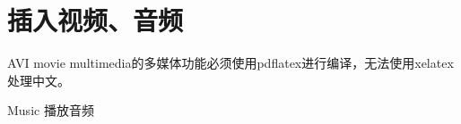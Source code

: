 \documentclass[xcolor=table,aspectratio=169]{beamer}
\begin{document}
\section{插入视频、音频}
\begin{frame}{AVI movie}
multimedia的多媒体功能必须使用pdflatex进行编译，无法使用xelatex处理中文。
\end{frame}
\begin{frame}{Music}
播放音频
\end{frame}
\end{document}
